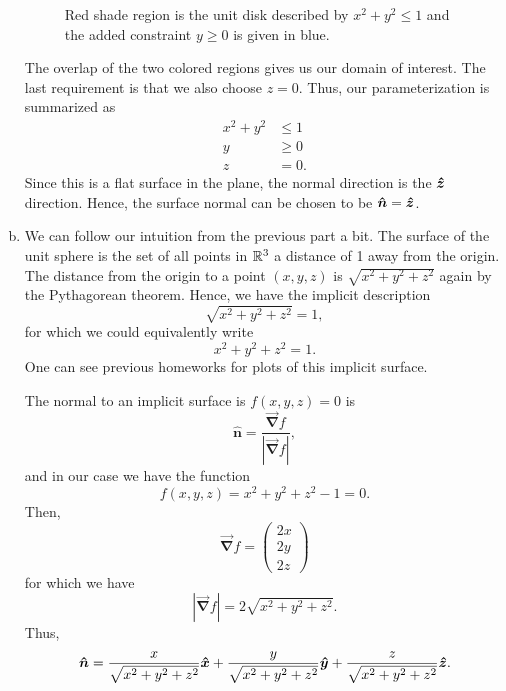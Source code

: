 \documentclass[12pt]{article} %
\newcommand{\grad}{\boldsymbol{\vec{\nabla}}}
\newcommand{\unitvec}{\boldsymbol{\hat{n}}}
\begin{document}
\begin{solution}
\begin{enumerate}[(a)]
\begin{figure}[H]
        \caption{Red shade region is the unit disk described by $x^2+y^2\leq 1$ and the added constraint $y\geq 0$ is given in blue.}
    \end{figure}
    The overlap of the two colored regions gives us our domain of interest. The last requirement is that we also choose $z=0$. Thus, our parameterization is summarized as
    \begin{align*}
    x^2+y^2 &\leq 1 \\
    y &\geq 0\\
    z &= 0.
    \end{align*}
    Since this is a flat surface in the plane, the normal direction is the $\boldsymbol{\hat{z}}$ direction. Hence, the surface normal can be chosen to be $\unitvec = \zhat$.
    
    \item We can follow our intuition from the previous part a bit. The surface of the unit sphere is the set of all points in $\mathbb{R}^3$ a distance of 1 away from the origin. The distance from the origin to a point $(x,y,z)$ is $\sqrt{x^2+y^2+z^2}$ again by the Pythagorean theorem. Hence, we have the implicit description
    \[
    \sqrt{x^2+y^2+z^2}=1,
    \]
    for which we could equivalently write
    \[
    x^2+y^2+z^2 =1.
    \]
    One can see previous homeworks for plots of this implicit surface.

    The normal to an implicit surface is $f(x,y,z)=0$ is
    \[
    \unitvec = \frac{\grad f}{|\grad f|},
    \]
    and in our case we have the function
    \[
    f(x,y,z) = x^2+y^2+z^2 -1 = 0.
    \]
    Then, 
    \[
    \grad f = \begin{pmatrix} 2x \\ 2y \\ 2z \end{pmatrix}
    \]
    for which we have
    \[
    |\grad f| = 2\sqrt{x^2+y^2+z^2}.
    \]
    Thus,
    \[
    \unitvec= \frac{x}{\sqrt{x^2+y^2+z^2}} \xhat  + \frac{y}{\sqrt{x^2+y^2+z^2}} \yhat  + \frac{z}{\sqrt{x^2+y^2+z^2}} \zhat.
    \]
\end{enumerate}
\end{solution}
\end{document}
